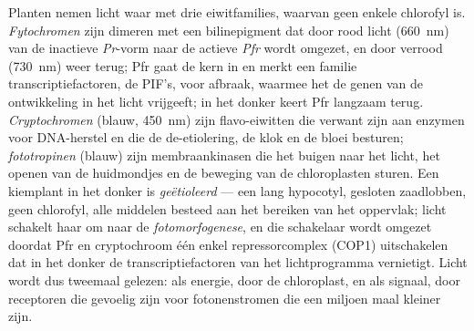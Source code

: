 \begin{definition}[Fotoreceptoren]\label{def:b3:plant-molecular-physiology:photoreceptors}
Planten nemen licht waar met drie eiwitfamilies, waarvan geen enkele
chlorofyl is. \emph{Fytochromen} zijn dimeren met een bilinepigment dat
door rood licht (\qty{660}{nm}) van de inactieve \emph{Pr}-vorm naar de
actieve \emph{Pfr} wordt omgezet, en door verrood (\qty{730}{nm}) weer
terug; Pfr gaat de kern in en merkt een familie transcriptiefactoren,
de PIF's, voor afbraak, waarmee het de genen van de ontwikkeling in het
licht vrijgeeft; in het donker keert Pfr langzaam terug.
\emph{Cryptochromen} (blauw, \qty{450}{nm}) zijn flavo-eiwitten die
verwant zijn aan enzymen voor DNA-herstel en die de de-etiolering, de
klok en de bloei besturen; \emph{fototropinen} (blauw) zijn
membraankinasen die het buigen naar het licht, het openen van de
huidmondjes en de beweging van de chloroplasten sturen. Een kiemplant
in het donker is \emph{geëtioleerd} --- een lang hypocotyl, gesloten
zaadlobben, geen chlorofyl, alle middelen besteed aan het bereiken van
het oppervlak; licht schakelt haar om naar de \emph{fotomorfogenese},
en die schakelaar wordt omgezet doordat Pfr en cryptochroom één enkel
repressorcomplex (COP1) uitschakelen dat in het donker de
transcriptiefactoren van het lichtprogramma vernietigt. Licht wordt dus
tweemaal gelezen: als energie, door de chloroplast, en als signaal,
door receptoren die gevoelig zijn voor fotonenstromen die een miljoen
maal kleiner zijn.
\end{definition}

